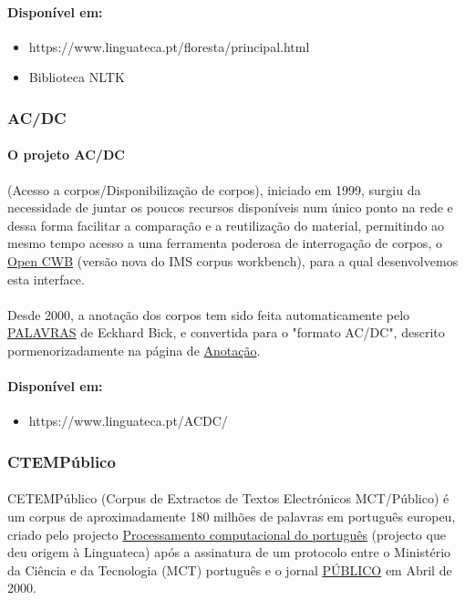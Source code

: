 \documentclass[a4paper, 10pt]{article}
\begin{document}
                \paragraph{Disponível em:}
                \begin{itemize}
				    \item https://www.linguateca.pt/floresta/principal.html
				    \item Biblioteca NLTK
	            \end{itemize}

            \subsubsection{AC/DC}
            	\paragraph{O projeto AC/DC }
            	(Acesso a corpos/Disponibilização de corpos), iniciado em 1999, surgiu da necessidade de juntar os poucos recursos disponíveis num único ponto na rede e dessa forma facilitar a comparação e a reutilização do material, permitindo ao mesmo tempo acesso a uma ferramenta poderosa de interrogação de corpos, o \href{http://cwb.sourceforge.net/}{Open CWB} (versão nova do IMS corpus workbench), para a qual desenvolvemos esta interface.
				\paragraph{}
				Desde 2000, a anotação dos corpos tem sido feita automaticamente pelo \href{http://visl.sdu.dk/visl/pt/}{PALAVRAS} de Eckhard Bick, e convertida para o "formato AC/DC", descrito pormenorizadamente na página de \href{https://www.linguateca.pt/acesso/anotacao.html}{Anotação}.
				\paragraph{Disponível em:}
				\begin{itemize}
				    \item https://www.linguateca.pt/ACDC/

			    \end{itemize}

            \subsubsection{CTEMPúblico}
            	\paragraph{} 
            	CETEMPúblico (Corpus de Extractos de Textos Electrónicos MCT/Público) é um corpus de aproximadamente 180 milhões de palavras em português europeu, criado pelo projecto \href{https://www.linguateca.pt/proc_comp_port.html}{Processamento computacional do português} (projecto que deu origem à Linguateca) após a assinatura de um protocolo entre o Ministério da Ciência e da Tecnologia (MCT) português e o jornal \href{https://www.publico.pt/}{PÚBLICO} em Abril de 2000.
\end{document}
